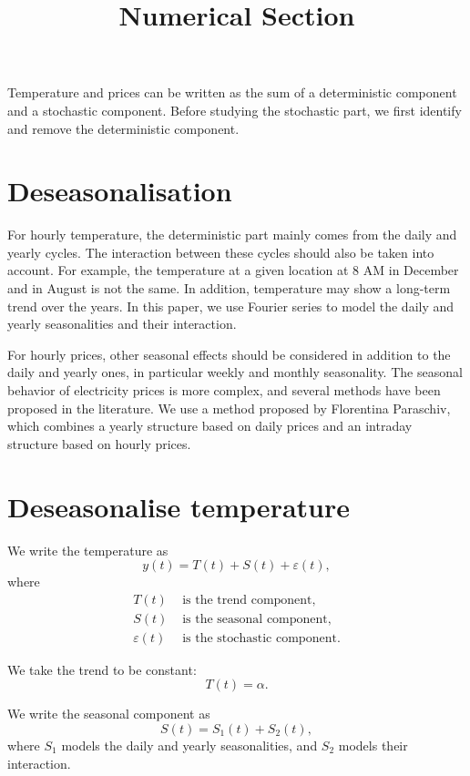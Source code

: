 \documentclass[11pt]{article}
\begin{document}
\title{Numerical Section}
\date{}
\maketitle

Temperature and prices can be written as the sum of a deterministic component and a stochastic component. Before studying the stochastic part, we first identify and remove the deterministic component.

\medskip

\section{Deseasonalisation}\label{sec:Deseasonalisation}

For hourly temperature, the deterministic part mainly comes from the daily and yearly cycles. The interaction between these cycles should also be taken into account. For example, the temperature at a given location at 8 AM in December and in August is not the same. In addition, temperature may show a long-term trend over the years. In this paper, we use Fourier series to model the daily and yearly seasonalities and their interaction.

\medskip

For hourly prices, other seasonal effects should be considered in addition to the daily and yearly ones, in particular weekly and monthly seasonality. The seasonal behavior of electricity prices is more complex, and several methods have been proposed in the literature. We use a method proposed by Florentina Paraschiv, which combines a yearly structure based on daily prices and an intraday structure based on hourly prices.


\section{Deseasonalise temperature}
We write the temperature as
\[
y(t)=T(t)+S(t)+\varepsilon(t),
\]
where
\[
\begin{aligned}
T(t)           &\text{ is the trend component},\\
S(t)           &\text{ is the seasonal component},\\
\varepsilon(t) &\text{ is the stochastic component}.
\end{aligned}
\]

We take the trend to be constant:
\[
T(t)=\alpha.
\]

We write the seasonal component as
\[
S(t)=S_1(t)+S_2(t),
\]
where \(S_1\) models the daily and yearly seasonalities, and \(S_2\) models their interaction.
\end{document}

